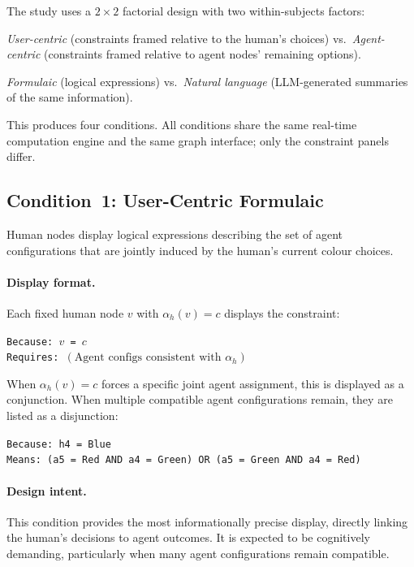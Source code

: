 \documentclass[10pt]{article}
\theoremstyle{definition}
\begin{document}
The study uses a $2 \times 2$ factorial design with two within-subjects factors:

\begin{description}[leftmargin=2em]
  \item[Perspective] \emph{User-centric} (constraints framed relative to the human's choices)
        vs.\ \emph{Agent-centric} (constraints framed relative to agent nodes' remaining options).
  \item[Representation] \emph{Formulaic} (logical expressions) vs.\ \emph{Natural language}
        (LLM-generated summaries of the same information).
\end{description}

This produces four conditions.  All conditions share the same real-time computation engine and
the same graph interface; only the constraint panels differ.

\subsection{Condition~1: User-Centric Formulaic}
\label{sec:c1}

Human nodes display logical expressions describing the set of agent configurations that are
jointly induced by the human's current colour choices.

\paragraph{Display format.}
Each fixed human node $v$ with $\alpha_h(v) = c$ displays the constraint:
\begin{center}
\small
\texttt{Because: $v$ = $c$}\\
\texttt{Requires: $(\text{Agent configs consistent with } \alpha_h)$}
\end{center}
When $\alpha_h(v) = c$ forces a specific joint agent assignment, this is displayed as a
conjunction.  When multiple compatible agent configurations remain, they are listed as a
disjunction:
\begin{center}
\small
\texttt{Because: h4 = Blue}\\
\texttt{Means: (a5 = Red AND a4 = Green) OR (a5 = Green AND a4 = Red)}
\end{center}

\paragraph{Design intent.}
This condition provides the most informationally precise display, directly linking the human's
decisions to agent outcomes.  It is expected to be cognitively demanding, particularly when many
agent configurations remain compatible.
\end{document}
